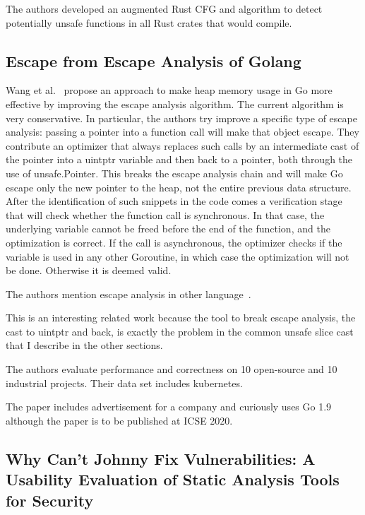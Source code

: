 The authors developed an augmented Rust CFG and algorithm to detect potentially unsafe functions in all Rust crates that
would compile.



\subsection{Escape from Escape Analysis of Golang}
\label{subsec:escape-from-escape-analysis-of-golang}

Wang et al.~\cite{wang2020} propose an approach to make heap memory usage in Go more effective by improving the escape
analysis algorithm.
The current algorithm is very conservative.
In particular, the authors try improve a specific type of escape analysis: passing a pointer into a function call will
make that object escape.
They contribute an optimizer that always replaces such calls by an intermediate cast of the pointer into a uintptr
variable and then back to a pointer, both through the use of unsafe.Pointer.
This breaks the escape analysis chain and will make Go escape only the new pointer to the heap, not the entire previous
data structure.
After the identification of such snippets in the code comes a verification stage that will check whether the function
call is synchronous.
In that case, the underlying variable cannot be freed before the end of the function, and the optimization is correct.
If the call is asynchronous, the optimizer checks if the variable is used in any other Goroutine, in which case the
optimization will not be done.
Otherwise it is deemed valid.

The authors mention escape analysis in other language~\cite{hill2002, hannan1998, choi1999}.

This is an interesting related work because the tool to break escape analysis, the cast to uintptr and back, is exactly
the problem in the common unsafe slice cast that I describe in the other sections.

The authors evaluate performance and correctness on 10 open-source and 10 industrial projects.
Their data set includes kubernetes.

The paper includes advertisement for a company and curiously uses Go 1.9 although the paper is to be published at ICSE
2020.



\subsection{Why Can’t Johnny Fix Vulnerabilities: A Usability Evaluation of Static Analysis Tools for Security}
\label{subsec:why-can’t-johnny-fix-vulnerabilities:-a-usability-evaluation-of-static-analysis-tools-for-security}

